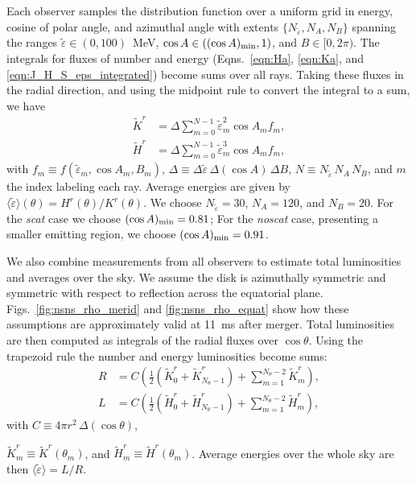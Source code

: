 \documentclass[aps,floatfix,prd,superscriptaddress,twocolumn]{revtex4-1}
\newcommand{\todo}[1]{\marginpar{\tiny{\textcolor{red}{#1}}}}
\renewcommand\todo[1]{} %
\begin{document}
Each observer samples the distribution function over a uniform grid
in energy, cosine of polar angle, and azimuthal angle with extents
$\{N_{\tilde{\varepsilon}},N_A, N_B\}$ spanning the ranges
$\tilde{\varepsilon}\in(0,100)$~MeV,
$\cos A\in\left((\cos A)_{\rm min}, 1\right)$, and
$B\in[0,2\pi)$.
The integrals for fluxes of number and energy
(Eqns.~\ref{eqn:Ha}, \ref{eqn:Ka}, and \ref{eqn:J_H_S_eps_integrated})
become sums over all rays.
Taking these fluxes in the radial direction,
and using the midpoint rule to convert the integral to a sum, we have
\begin{align}
  \label{eqn:Kr_minkowski}
  \tilde{K}^r &= \Delta
  \sum\limits_{m=0}^{N-1}
  \tilde{\varepsilon}_m^2 \cos A_m f_m,\\
  \label{eqn:Hr_minkowski}
  \tilde{H}^r &= \Delta
  \sum\limits_{m=0}^{N-1}
  \tilde{\varepsilon}_m^3 \cos A_m f_m,
\end{align}
with $f_m \equiv f(\tilde{\varepsilon}_m,\cos A_m, B_m)$,
$\Delta \equiv \Delta\tilde{\varepsilon}\, \Delta(\cos A)\, \Delta B$,
$N \equiv N_{\tilde{\varepsilon}}\, N_A\, N_B$,
and $m$ the index labeling each ray.
Average energies are given by
$\langle\tilde{\varepsilon}\rangle(\theta)=H^r(\theta)/K^r(\theta)$.
We choose $N_{\tilde{\varepsilon}}=30$, $N_A=120$, and $N_B=20$.
For the \emph{scat} case we choose $(\cos A)_{\rm min}=0.81$;
For the \emph{noscat} case, presenting a smaller emitting region,
we choose $(\cos A)_{\rm min}=0.91$.

We also combine measurements from all observers to estimate
total luminosities and averages over the sky.
We assume the disk is azimuthally symmetric and
symmetric with respect to reflection across the equatorial plane.
Figs.~\ref{fig:nsns_rho_merid} and \ref{fig:nsns_rho_equat} show how these
assumptions are approximately valid at 11~ms after merger.
Total luminosities are then computed as integrals of the radial fluxes
over $\cos\theta$.
Using the trapezoid rule the number and energy luminosities become sums:
\begin{align}
  \label{eqn:luminosity_R}
  R &= C
  \left(\frac{1}{2}(\tilde{K}^r_0+\tilde{K}^r_{N_\theta-1})
  +\sum\limits_{m=1}^{N_\theta-2}\tilde{K}^r_m\right),\\
  \label{eqn:luminosity_L}
  L &= C
  \left(\frac{1}{2}(\tilde{H}^r_0+\tilde{H}^r_{N_\theta-1})
  +\sum\limits_{m=1}^{N_\theta-2}\tilde{H}^r_m\right),
\end{align}
with $C \equiv 4\pi r^2\, \Delta(\cos \theta)$,
\todo{source of GR error in coordinate $r$}
$\tilde{K}^r_m \equiv \tilde{K}^r(\theta_m)$, and
$\tilde{H}^r_m \equiv \tilde{H}^r(\theta_m)$.
Average energies over the whole sky are then
$\langle\tilde{\varepsilon}\rangle=L/R$.
\end{document}
